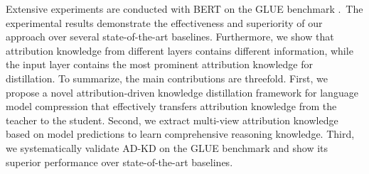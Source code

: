 \documentclass[11pt]{article}
\begin{document}

Extensive experiments are conducted with BERT \citep{devlin-etal-2019-bert} on the GLUE benchmark \citep{wang-etal-2018-glue}.~The experimental results demonstrate the effectiveness and superiority of our approach over several state-of-the-art baselines. Furthermore, we show that attribution knowledge from different layers contains different information, while the input layer contains the most prominent attribution knowledge for distillation. To summarize, the main contributions are threefold. First, we propose a novel attribution-driven knowledge distillation framework for language model compression that effectively transfers attribution knowledge from the teacher to the student. Second, we extract multi-view attribution knowledge based on model predictions to learn comprehensive reasoning knowledge. Third, we systematically validate AD-KD on the GLUE benchmark and show its superior performance over state-of-the-art baselines.


\end{document}
